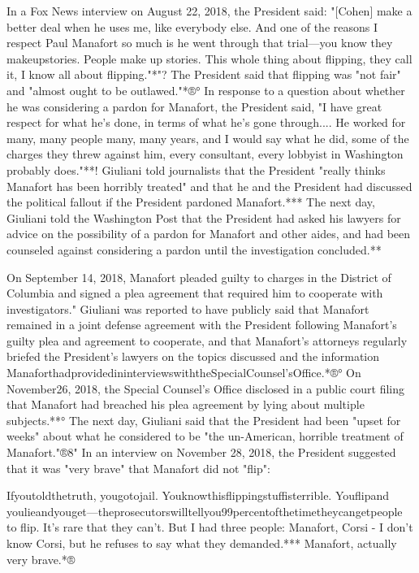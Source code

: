 In a Fox News interview on August 22, 2018, the President said: "[Cohen] make a better deal when he uses me, like everybody else.
And one of the reasons I respect Paul Manafort so much is he went through that trial—you know they makeupstories.
People make up stories.
This whole thing about flipping, they call it, I know all about flipping."*"?
The President said that flipping was "not fair" and "almost ought to be outlawed."*®°
In response to a question about whether he was considering a pardon for Manafort, the President said, "I have great respect for what he's done, in terms of what he's gone through....
He worked for many, many people many, many years, and I would say what he did, some of the charges they threw against him, every consultant, every lobbyist in Washington probably does."**!
Giuliani told journalists that the President "really thinks Manafort has been horribly treated" and that he and the President had discussed the political fallout if the President pardoned Manafort.***
The next day, Giuliani told the Washington Post that the President had asked his lawyers for advice on the possibility of a pardon for Manafort and other aides, and had been counseled against considering a pardon until the investigation concluded.**

On September 14, 2018, Manafort pleaded guilty to charges in the District of Columbia and signed a plea agreement that required him to cooperate with investigators."
Giuliani was reported to have publicly said that Manafort remained in a joint defense agreement with the President following Manafort's guilty plea and agreement to cooperate, and that Manafort's attorneys regularly briefed the President's lawyers on the topics discussed and the information ManaforthadprovidedininterviewswiththeSpecialCounsel'sOffice.*®°
On November26, 2018, the Special Counsel's Office disclosed in a public court filing that Manafort had breached his plea agreement by lying about multiple subjects.**°
The next day, Giuliani said that the President had been "upset for weeks" about what he considered to be "the un-American, horrible treatment of Manafort."®8"
In an interview on November 28, 2018, the President suggested that it was "very brave" that Manafort did not "flip":

Ifyoutoldthetruth, yougotojail.
Youknowthisflippingstuffisterrible.
Youflipand youlieandyouget—theprosecutorswilltellyou99percentofthetimetheycangetpeople to flip.
It's rare that they can't.
But I had three people: Manafort, Corsi - I don't know Corsi, but he refuses to say what they demanded.***
Manafort, actually very brave.*®

